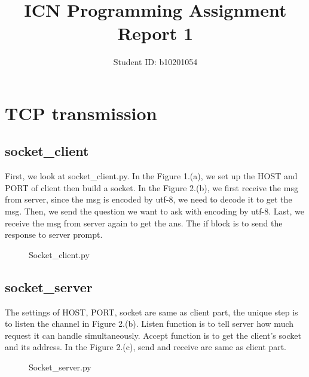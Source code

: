 \documentclass[12pt,a4paper]{article}
\title{ICN Programming Assignment Report 1}
\author{Student ID: b10201054}
\begin{document}
\maketitle

\section{TCP transmission}

\subsection{socket\_client}
First, we look at socket\_client.py. In the Figure 1.(a), we set up the HOST and PORT of client then build a socket.
In the Figure 2.(b), we first receive the msg from server, since the msg is encoded by utf-8, we need to decode it to get the msg.
Then, we send the question we want to ask with encoding by utf-8. Last, we receive the msg from server again to get the ans.
The if block is to send the response to server prompt.
\begin{figure}[H]
    \centering
    \caption{Socket\_client.py}
\end{figure}

\subsection{socket\_server}
The settings of HOST, PORT, socket are same as client part, the unique step is to listen the channel in Figure 2.(b). 
Listen function is to tell server how much request it can handle simultaneously. 
Accept function is to get the client's socket and its address.
In the Figure 2.(c), send and receive are same as client part. 
\begin{figure}[H]
    \centering
    \caption{Socket\_server.py}
\end{figure}
\newpage
\end{document}
